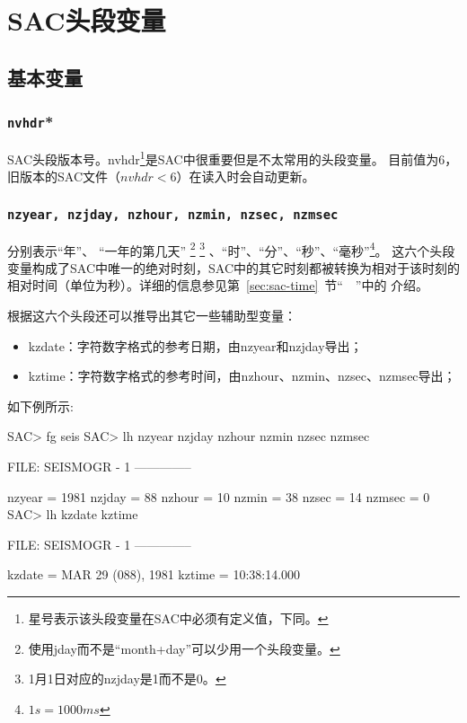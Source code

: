 \section{SAC头段变量}
\label{sec:sac-header-variables}

\subsection{基本变量}

\subsubsection{\texttt{nvhdr}*}
SAC头段版本号。nvhdr\footnote{星号表示该头段变量在SAC中必须有定义值，下同。}是SAC中很重要但是不太常用的头段变量。
目前值为6，旧版本的SAC文件（$nvhdr<6$）在读入时会自动更新。

\subsubsection{\texttt{nzyear, nzjday, nzhour, nzmin, nzsec, nzmsec}}
分别表示``年''、
``一年的第几天''
\footnote{使用jday而不是``month+day''可以少用一个头段变量。}
\footnote{1月1日对应的nzjday是1而不是0。}
、``时''、``分''、``秒''、``毫秒''\footnote{$1 s = 1000 ms$}。
这六个头段变量构成了SAC中唯一的绝对时刻，SAC中的其它时刻都被转换为相对于该时刻的
相对时间（单位为秒）。详细的信息参见第~\ref{sec:sac-time}~节``~~''中的
介绍。

根据这六个头段还可以推导出其它一些辅助型变量：
\begin{itemize}
\ttfamily
\item kzdate：字符数字格式的参考日期，由nzyear和nzjday导出；
\item kztime：字符数字格式的参考时间，由nzhour、nzmin、nzsec、nzmsec导出；
\end{itemize}

如下例所示:
\begin{SACCode}
SAC> fg seis
SAC> lh nzyear nzjday nzhour nzmin nzsec nzmsec

  FILE: SEISMOGR - 1
 --------------

     nzyear = 1981
     nzjday = 88
     nzhour = 10
      nzmin = 38
      nzsec = 14
     nzmsec = 0
SAC> lh kzdate kztime

  FILE: SEISMOGR - 1
 --------------

     kzdate = MAR 29 (088), 1981
     kztime = 10:38:14.000
\end{SACCode}

